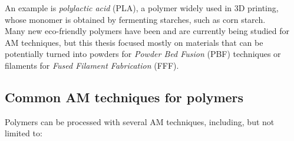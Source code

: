 \documentclass[a4paper]{article}
\begin{document}
    An example is \textit{polylactic acid} (PLA), a polymer widely used in 3D printing, whose monomer is obtained by fermenting starches, such as corn starch. \\ 

    Many new eco-friendly polymers have been and are currently being studied for AM techniques, but this thesis focused mostly on materials that can be potentially turned 
    into powders for \textit{Powder Bed Fusion} (PBF) techniques or filaments for \textit{Fused Filament Fabrication} (FFF). 
    
    \subsection{Common AM techniques for polymers\label{AM_techniques_summary}}
    
    Polymers can be processed with several AM techniques, including, but not limited to: 
\end{document}
